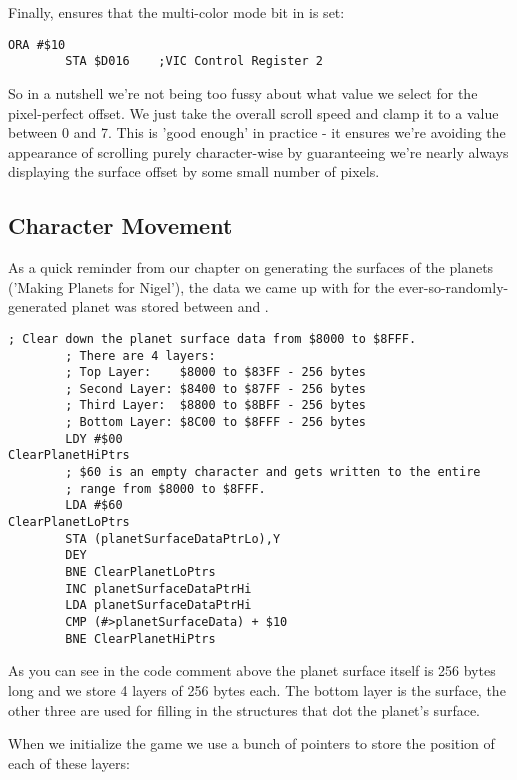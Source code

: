 Finally,  ensures that the multi-color mode bit in  is set:

\begin{lstlisting}[]
        ORA #$10
        STA $D016    ;VIC Control Register 2
\end{lstlisting}

So in a nutshell we're not being too fussy about what value we select for the pixel-perfect offset. We
just take the overall scroll speed and clamp it to a value between 0 and 7. This is 'good enough' in 
practice - it ensures we're avoiding the appearance of scrolling purely character-wise by guaranteeing
we're nearly always displaying the surface offset by some small number of pixels.

\subsection{Character Movement}

As a quick reminder from our chapter on generating the surfaces of the planets ('Making Planets for Nigel'),
the data we came up with for the ever-so-randomly-generated planet was stored between  and .

\begin{lstlisting}[caption=The surface data is stored from \icode{\$8000} to \icode{\$8FFF}. This code overwrites it all with 
the value \$60\, which is an empty bitmap.]
        ; Clear down the planet surface data from $8000 to $8FFF.
        ; There are 4 layers:
        ; Top Layer:    $8000 to $83FF - 256 bytes 
        ; Second Layer: $8400 to $87FF - 256 bytes 
        ; Third Layer:  $8800 to $8BFF - 256 bytes 
        ; Bottom Layer: $8C00 to $8FFF - 256 bytes 
        LDY #$00
ClearPlanetHiPtrs   
        ; $60 is an empty character and gets written to the entire
        ; range from $8000 to $8FFF.
        LDA #$60
ClearPlanetLoPtrs   
        STA (planetSurfaceDataPtrLo),Y
        DEY
        BNE ClearPlanetLoPtrs
        INC planetSurfaceDataPtrHi
        LDA planetSurfaceDataPtrHi
        CMP (#>planetSurfaceData) + $10
        BNE ClearPlanetHiPtrs
\end{lstlisting}

As you can see in the code comment above the planet surface itself is 256 bytes long and we store 4 layers of 256
bytes each. The bottom layer is the surface, the other three are used for filling in the structures that dot the
planet's surface.

When we initialize the game we use a bunch of pointers to store the position of each of these layers:

